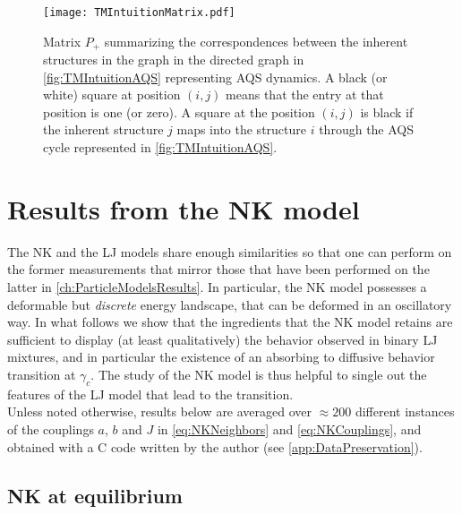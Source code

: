 \begin{figure}
\centering 
\texttt{[image: TMIntuitionMatrix.pdf]} 
\caption{Matrix $P_{+}$ summarizing the correspondences between the inherent structures in the graph in the directed graph in \autoref{fig:TMIntuitionAQS} representing AQS dynamics. A black (or white) square at position $(i,j)$ means that the entry at that position is one (or zero). A square at the position $(i,j)$ is black if the inherent structure $j$ maps into the structure $i$ through the AQS cycle represented in \autoref{fig:TMIntuitionAQS}.\label{fig:TMIntuitionMatrix}}
\end{figure}

\pagebreak

\section{Results from the NK model}
The NK and the LJ models share enough similarities so that one can perform on the former measurements that mirror those that have been performed on the latter in \autoref{ch:ParticleModelsResults}. In particular, the NK model possesses a deformable but \emph{discrete} energy landscape, that can be deformed in an oscillatory way. In what follows we show that the ingredients that the NK model retains are sufficient to display (at least qualitatively) the behavior observed in binary LJ mixtures, and in particular the existence of an absorbing to diffusive behavior transition at $\gamma_{c}$. The study of the NK model is thus helpful to single out the features of the LJ model that lead to the transition.\\
Unless noted otherwise, results below are averaged over $\approx 200$ different instances of the couplings $a$, $b$ and $J$ in \autoref{eq:NKNeighbors} and \autoref{eq:NKCouplings}, and obtained with a C code written by the author (see \autoref{app:DataPreservation}).

\subsection{NK at equilibrium}

